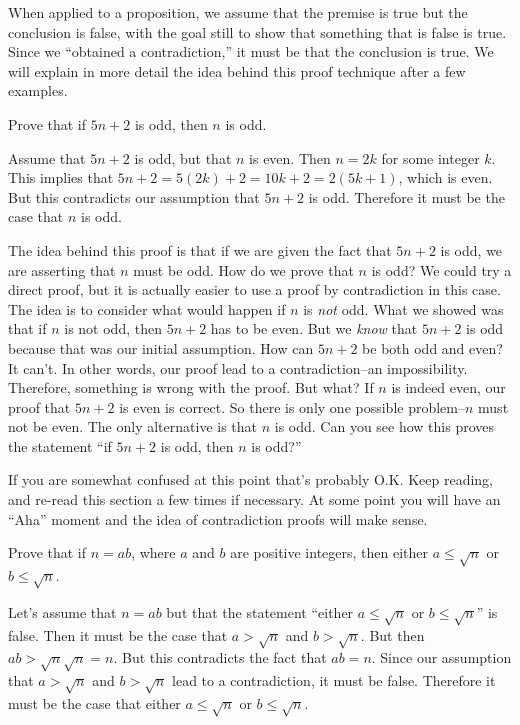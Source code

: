 When applied to a proposition, we assume that the premise is true but the conclusion is false,
with the goal still to show that something that is false is true. Since we ``obtained a contradiction,''
it must be that the conclusion is true. We will explain in more detail the idea behind this proof technique
after a few examples.

\begin{exa}
Prove that if $5n+2$ is odd, then $n$ is odd.
\begin{pf}
Assume that $5n+2$ is odd, but that $n$ is even.  Then $n=2k$ for some integer $k$.
This implies that
$5n+2=5(2k)+2 = 10k+2=2(5k+1)$, which is even.  But this contradicts our assumption that
$5n+2$ is odd.  Therefore it must be the case that $n$ is odd.
\end{pf}
The idea behind this proof is that if we are given the fact that $5n+2$ is odd, 
we are asserting that $n$ must be odd.
How do we prove that $n$ is odd?  We could try a direct proof, but it is actually easier to 
use a proof by contradiction in this case.  
The idea is to consider what would happen if $n$ is {\em not} odd.  
What we showed was that if $n$ is not odd, then $5n+2$ has to be even.  
But we {\em know} that $5n+2$ is odd because that was our initial assumption. 
How can $5n+2$ be both odd and even?  It can't. 
In other words, our proof lead to a contradiction--an impossibility.  
Therefore, something is wrong with the proof.  But what?  
If $n$ is indeed even, our proof that $5n+2$ is even is correct.  So there is only
one possible problem--$n$ must not be even.  The only alternative is that $n$ is odd.
Can you see how this proves the statement ``if $5n+2$ is odd, then $n$ is odd?''
\end{exa}

\begin{rem}
If you are somewhat confused at this point that's probably O.K.  Keep reading, and re-read
this section a few times if necessary.  At some point you will have an ``Aha'' moment and
the idea of contradiction proofs will make sense.
\end{rem}

\begin{exa}
Prove that if $n=ab$, where $a$ and $b$ are positive integers, then either $a\leq \sqrt{n}$ or $b\leq \sqrt{n}$.
\begin{pf}
Let's assume that $n=ab$ but that the statement ``either $a\leq \sqrt{n}$ or $b\leq \sqrt{n}$'' is false.  
Then it must be the case that $a>\sqrt{n}$ and $b>\sqrt{n}$.  But then $a b >\sqrt{n}\sqrt{n}=n$.
But this contradicts the fact that $ab=n$.  Since our assumption that  $a>\sqrt{n}$ and $b>\sqrt{n}$
lead to a contradiction, it must be false.
Therefore it must be the case that either $a\leq \sqrt{n}$ or $b\leq \sqrt{n}$.
\end{pf}
\end{exa}

